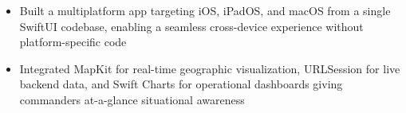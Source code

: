 \begin{itemize}
    \item Built a multiplatform app targeting iOS, iPadOS, and macOS from a single SwiftUI codebase, enabling a seamless cross-device experience without platform-specific code
    \item Integrated MapKit for real-time geographic visualization, URLSession for live backend data, and Swift Charts for operational dashboards giving commanders at-a-glance situational awareness
\end{itemize}
